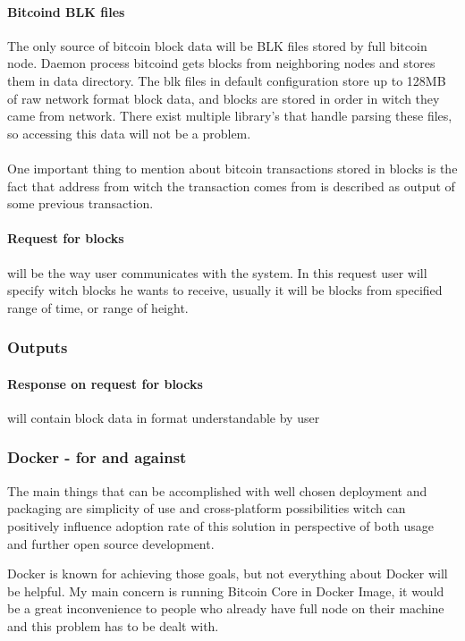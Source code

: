 \documentclass{article}
\begin{document}
\paragraph{Bitcoind BLK files}
The only source of bitcoin block data will be BLK files stored by full bitcoin node. Daemon process bitcoind gets blocks from neighboring nodes and stores them in data directory. The blk files in default configuration store up to 128MB of raw network format block data, and blocks are stored in order in witch they came from network. There exist multiple library's that handle parsing these files, so accessing this data will not be a problem.
\\
\\
One important thing to mention about bitcoin transactions stored in blocks is the fact that address from witch the transaction comes from is described as output of some previous transaction.

\paragraph{Request for blocks} will be the way user communicates with the system. In this request user will specify witch blocks he wants to receive, usually it will be blocks from specified range of time, or range of height.

\subsubsection{Outputs}
\paragraph{Response on request for blocks} will contain block data in format understandable by user 

\subsubsection*{Docker - for and against}

The main things that can be accomplished with well chosen deployment and packaging are simplicity of use and cross-platform possibilities witch can positively influence adoption rate of this solution in perspective of both usage and further open source development.

Docker is known for achieving those goals, but not everything about Docker will be helpful. My main concern is running Bitcoin Core in Docker Image, it would be a great inconvenience to people who already have full node on their machine and this problem has to be dealt with.
\end{document}
